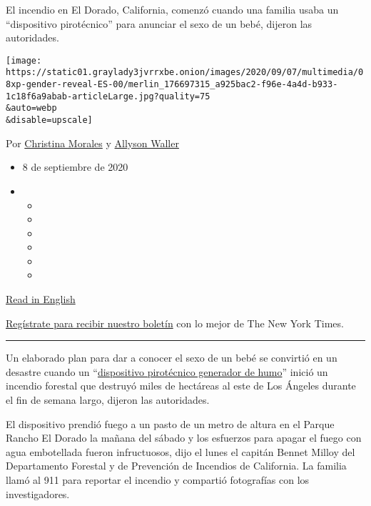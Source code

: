 El incendio en El Dorado, California, comenzó cuando una familia usaba
un ``dispositivo pirotécnico'' para anunciar el sexo de un bebé, dijeron
las autoridades.

\texttt{[image: https://static01.graylady3jvrrxbe.onion/images/2020/09/07/multimedia/08xp-gender-reveal-ES-00/merlin\_176697315\_a925bac2-f96e-4a4d-b933-1c18f6a9abab-articleLarge.jpg?quality=75\\\&auto=webp\\\&disable=upscale]}

Por
\href{https://www.nytimes3xbfgragh.onion/by/christina-morales}{Christina
Morales} y
\href{https://www.nytimes3xbfgragh.onion/by/allyson-waller}{Allyson
Waller}

\begin{itemize}
\item
  8 de septiembre de 2020
\item
  \begin{itemize}
  \item
  \item
  \item
  \item
  \item
  \item
  \end{itemize}
\end{itemize}

\href{https://www.nytimes3xbfgragh.onion/2020/09/07/us/gender-reveal-party-wildfire.html}{Read
in English}

\href{https://www.nytimes3xbfgragh.onion/newsletters/el-times}{Regístrate
para recibir nuestro boletín} con lo mejor de The New York Times.

\begin{center}\rule{0.5\linewidth}{\linethickness}\end{center}

Un elaborado plan para dar a conocer el sexo de un bebé se convirtió en
un desastre cuando un
``\href{https://www.instagram.com/p/CE0ddK-hHo1/?igshid=d1a7knxin4dc}{dispositivo
pirotécnico generador de humo}'' inició un incendio forestal que
destruyó miles de hectáreas al este de Los Ángeles durante el fin de
semana largo, dijeron las autoridades.

El dispositivo prendió fuego a un pasto de un metro de altura en el
Parque Rancho El Dorado la mañana del sábado y los esfuerzos para apagar
el fuego con agua embotellada fueron infructuosos, dijo el lunes el
capitán Bennet Milloy del Departamento Forestal y de Prevención de
Incendios de California. La familia llamó al 911 para reportar el
incendio y compartió fotografías con los investigadores.

